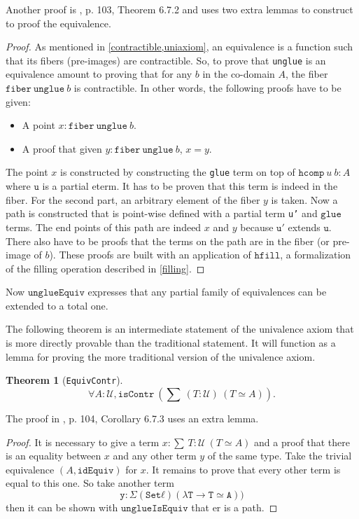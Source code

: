 \documentclass[12pt,a4paper,twoside,xetex]{book} %
\newtheorem{theorem}{Theorem}[section]
\newcommand{\op}[1]{\mathtt{#1}}
\newcommand{\type}{\mathcal{U}}
\begin{document}
Another proof is \cite{Huber2016}, p. 103, Theorem 6.7.2 and uses two extra 
lemmas to construct to proof the equivalence.

\begin{proof}
As mentioned in \cref{contractible,uniaxiom}, an equivalence is a function such 
that its fibers (pre-images) are contractible. So, to prove that 
\texttt{unglue} is an equivalence amount to proving that for any $b$ in the 
co-domain $A$, the fiber $\op{fiber}\ \op{unglue} \ b$ is contractible. In 
other words, the following proofs have to be given:
\begin{itemize}
\item A point  $x : \op{fiber}\ \op{unglue} \ b$. 
\item A proof that given $y : \op{fiber}\ \op{unglue} \ b$, $x = y$. 
\end{itemize}
The point $x$ is constructed by constructing the \texttt{glue} term on top of 
$\texttt{hcomp} \ u \ b : A$ where $\op{u}$ is a partial eterm. It has to be 
proven that this term is indeed in the fiber. For the second part, an arbitrary 
element of the fiber $y$ is taken. Now a path is constructed that is point-wise 
defined with a partial term \texttt{u'} and $\op{glue}$ terms. The end points 
of this path are indeed $x$ and $y$ because $\op{u'}$ extends $\op{u}$. There 
also have to be proofs that the terms on the path are in the fiber (or 
pre-image of $b$). These proofs are built with an application of $\op{hfill}$, 
a formalization of the filling operation described in \cref{filling}.
\end{proof}

Now $\op{unglueEquiv}$  expresses that any partial family of equivalences can 
be extended to a total one.

The following theorem is an intermediate statement of the univalence axiom that 
is more directly provable than the traditional statement. It will function as a 
lemma for proving the more traditional version of the univalence axiom.

\begin{theorem}[\texttt{EquivContr}]\label{contrSingl}
 $$\forall A : \type, \op{isContr} \ \left( \sum \ (T : \type) \  \left( T 
\simeq A \right) \right).$$ 
\end{theorem}


The proof in \cite{Huber2016}, p. 104, Corollary 6.7.3 uses an extra lemma.

\begin{proof}
It is necessary to give a term $x : \sum \ T : \type \  \left( T \simeq 
A \right)$ and a proof that there is an equality between $x$ and any other term 
$y$ of the same type. Take the trivial equivalence  $(A, \op{idEquiv})$ for 
$x$. It remains to prove that every other term is equal to this one. So take 
another term $$\op{y : Σ (Set ℓ) (λ T → T ≃ A))}$$ then it can be shown with 
$\op{unglueIsEquiv}$ that er is a path.
\end{proof}
\end{document}
